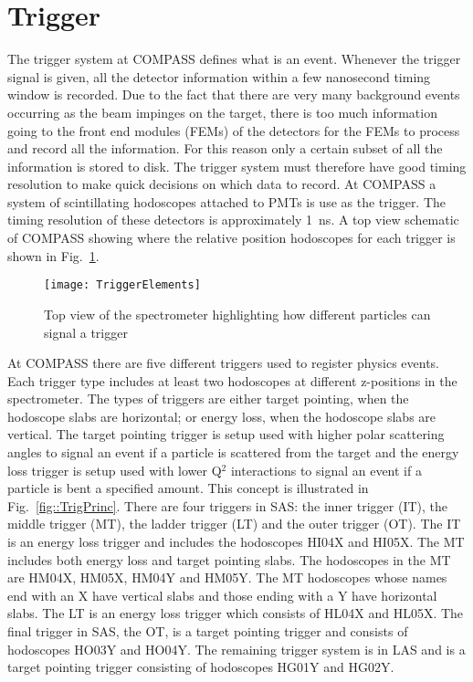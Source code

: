 \section{Trigger}
The trigger system at COMPASS defines what is an event.  Whenever the trigger
signal is given, all the detector information within a few nanosecond timing
window is recorded.  Due to the fact that there are very many
background events occurring as the beam impinges on the target, there is too
much information going to the front end modules (FEMs) of the detectors for the
FEMs to process and record all the information.  For this reason only a certain
subset of all the information is stored to disk.  The trigger system must
therefore have good timing resolution to make quick decisions on which data to
record.  At COMPASS a system of scintillating hodoscopes attached to PMTs is use
as the trigger.  The timing resolution of these detectors is approximately 1~ns.
A top view schematic of COMPASS showing where the relative position hodoscopes
for each trigger is shown in Fig.~\ref{fig::TriggerElements}.  \par

\begin{figure}[h!t]
  \centering
  \texttt{[image: TriggerElements]}
  \caption{Top view of the spectrometer highlighting how different particles can
    signal a trigger}
  \label{fig::TriggerElements}
\end{figure}

At COMPASS there are five different triggers used to register physics events.
Each trigger type includes at least two hodoscopes at different z-positions in
the spectrometer.  The types of triggers are either target pointing, when the
hodoscope slabs are horizontal; or energy loss, when the hodoscope slabs are
vertical.  The target pointing trigger is setup used with higher polar
scattering angles to signal an event if a particle is scattered from the target
and the energy loss trigger is setup used with lower Q$^2$ interactions to
signal an event if a particle is bent a specified amount.  This concept is
illustrated in Fig.~\ref{fig::TrigPrinc}.  There are four triggers in SAS: the
inner trigger (IT), the middle trigger (MT), the ladder trigger (LT) and the
outer trigger (OT).  The IT is an energy loss trigger and includes the
hodoscopes HI04X and HI05X.  The MT includes both energy loss and target
pointing slabs.  The hodoscopes in the MT are HM04X, HM05X, HM04Y and HM05Y.
The MT hodoscopes whose names end with an X have vertical slabs and those ending
with a Y have horizontal slabs.  The LT is an energy loss trigger which consists
of HL04X and HL05X.  The final trigger in SAS, the OT, is a target pointing
trigger and consists of hodoscopes HO03Y and HO04Y.  The remaining trigger
system is in LAS and is a target pointing trigger consisting of hodoscopes HG01Y
and HG02Y. \par

